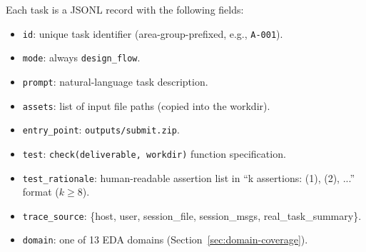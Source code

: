 Each task is a JSONL record with the following fields:
\begin{itemize}
    \item \texttt{id}: unique task identifier (area-group-prefixed, e.g., \texttt{A-001}).
    \item \texttt{mode}: always \texttt{design\_flow}.
    \item \texttt{prompt}: natural-language task description.
    \item \texttt{assets}: list of input file paths (copied into the workdir).
    \item \texttt{entry\_point}: \texttt{outputs/submit.zip}.
    \item \texttt{test}: \texttt{check(deliverable, workdir)} function specification.
    \item \texttt{test\_rationale}: human-readable assertion list in ``k assertions: (1), (2), ...'' format ($k \geq 8$).
    \item \texttt{trace\_source}: \{host, user, session\_file, session\_msgs, real\_task\_summary\}.
    \item \texttt{domain}: one of 13 EDA domains (Section~\ref{sec:domain-coverage}).
\end{itemize}
